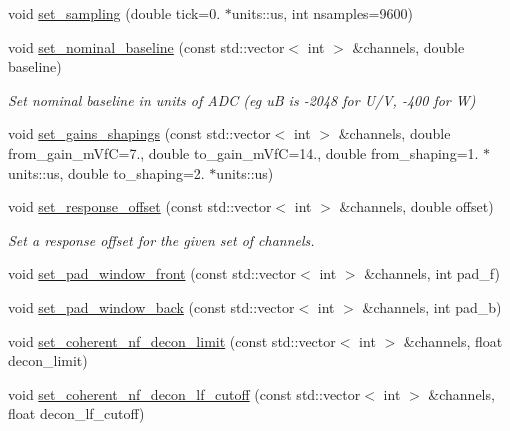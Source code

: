 \begin{DoxyCompactItemize}
void \hyperlink{class_wire_cell_1_1_sig_proc_1_1_simple_channel_noise_d_b_a9ede3bdc966580756f9fff4070e8348b}{set\+\_\+sampling} (double tick=0. $\ast$units\+::us, int nsamples=9600)
\item 
void \hyperlink{class_wire_cell_1_1_sig_proc_1_1_simple_channel_noise_d_b_a566b36743c0a1cb0bd831a0086dad3b7}{set\+\_\+nominal\+\_\+baseline} (const std\+::vector$<$ int $>$ \&channels, double baseline)
\begin{DoxyCompactList}\small\item\em Set nominal baseline in units of A\+DC (eg uB is -\/2048 for U/V, -\/400 for W) \end{DoxyCompactList}\item 
void \hyperlink{class_wire_cell_1_1_sig_proc_1_1_simple_channel_noise_d_b_a82e2e7cf205e61e1ab1e7970aa6655cb}{set\+\_\+gains\+\_\+shapings} (const std\+::vector$<$ int $>$ \&channels, double from\+\_\+gain\+\_\+m\+VfC=7., double to\+\_\+gain\+\_\+m\+VfC=14., double from\+\_\+shaping=1. $\ast$units\+::us, double to\+\_\+shaping=2. $\ast$units\+::us)
\item 
void \hyperlink{class_wire_cell_1_1_sig_proc_1_1_simple_channel_noise_d_b_adce8a777da71112d25e077a610de2a94}{set\+\_\+response\+\_\+offset} (const std\+::vector$<$ int $>$ \&channels, double offset)
\begin{DoxyCompactList}\small\item\em Set a response offset for the given set of channels. \end{DoxyCompactList}\item 
void \hyperlink{class_wire_cell_1_1_sig_proc_1_1_simple_channel_noise_d_b_aeb80b3766efb4756055bbe016cd58e2c}{set\+\_\+pad\+\_\+window\+\_\+front} (const std\+::vector$<$ int $>$ \&channels, int pad\+\_\+f)
\item 
void \hyperlink{class_wire_cell_1_1_sig_proc_1_1_simple_channel_noise_d_b_a08eb429fdab1899edfe52bf8593ba56e}{set\+\_\+pad\+\_\+window\+\_\+back} (const std\+::vector$<$ int $>$ \&channels, int pad\+\_\+b)
\item 
void \hyperlink{class_wire_cell_1_1_sig_proc_1_1_simple_channel_noise_d_b_a44e68d8302a63ca34e82c9f6dfb5b209}{set\+\_\+coherent\+\_\+nf\+\_\+decon\+\_\+limit} (const std\+::vector$<$ int $>$ \&channels, float decon\+\_\+limit)
\item 
void \hyperlink{class_wire_cell_1_1_sig_proc_1_1_simple_channel_noise_d_b_aa8e97e9e59e9a91d23b572acd6eec29b}{set\+\_\+coherent\+\_\+nf\+\_\+decon\+\_\+lf\+\_\+cutoff} (const std\+::vector$<$ int $>$ \&channels, float decon\+\_\+lf\+\_\+cutoff)

\end{DoxyCompactItemize}
